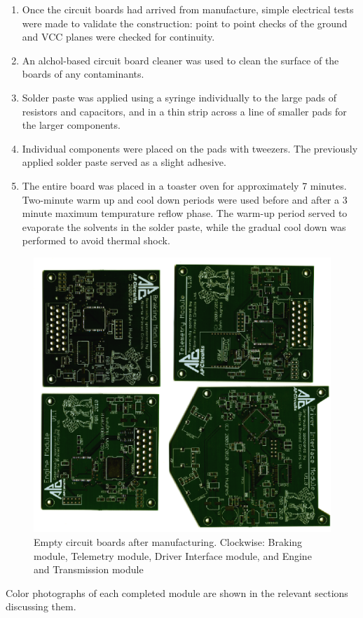 \begin{enumerate}
  \item Once the circuit boards had arrived from manufacture, simple electrical tests were made to validate the construction: point to point checks of the ground and VCC planes were checked for continuity.
  \item An alchol-based circuit board cleaner was used to clean the surface of the boards of any contaminants.
  \item Solder paste was applied using a syringe individually to the large pads of resistors and capacitors, and in a thin strip across a line of smaller pads for the larger components.
  \item Individual components were placed on the pads with tweezers. The previously applied solder paste served as a slight adhesive.
  \item The entire board was placed in a toaster oven for approximately 7 minutes. Two-minute warm up and cool down periods were used before and after a 3 minute maximum tempurature reflow phase. The warm-up period served to evaporate the solvents in the solder paste, while the gradual cool down was performed to avoid thermal shock.
\end{enumerate}

\begin{figure}[h]
 \centering
 \includegraphics[width=5in,keepaspectratio]{implementation/figures/empty_pcbs.eps}
 \caption[Empty circuit boards after manufacturing.]{Empty circuit boards after manufacturing. Clockwise: Braking module, Telemetry module, Driver Interface module, and Engine and Transmission module}
 \label{fig:empty_pcbs}
\end{figure}

Color photographs of each completed module are shown in the relevant sections discussing them.